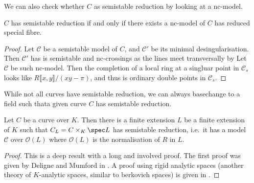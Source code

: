 We can also check whether $C$ as semistable reduction by looking at a nc-model. 
\begin{lemma}\label{lem:semistable_nc_model}
	$C$ has semistable reduction if and only if there exists a nc-model of  $C$ has reduced special fibre. 
\end{lemma}
\begin{proof}
	\ltr Let $ \mathscr C$ be a semistable model of $C$, and $\mathscr C'$ be its minimal desingularisation. 
	Then $\mathscr C'$ has is semistable and nc-crossings as the lines meet transversally by \cite[cor.\ 10.3.25]{liuAlgebraicGeometryArithmetic2002}
	\rtl Let  $\mathscr C$ be such nc-model. 
	Then the completion of a local ring at a singluar point in $\mathscr C_s$ looks like $R\llbracket x, y \rrbracket /(xy - \pi)$, and thus is ordinary double points in $\mathscr C_s$.
\end{proof}



While not all curves have semistable reduction, we can always basechange to a field such thata given curve  $C$ has semistable reduction. 

\begin{theorem}
	Let $C$ be a curve over $K$. 
	Then there is a finite extension $L$ be a finite extension of $K$ such that $C_L  = C \times _K \spec L$ has semistable reduction, i.e.\
	it has a model $\mathscr C$ over $\mathcal{O}(L)$ where $\mathcal{O}(L)$ is the normalisation of $R$ in $L$. 
\end{theorem}
\begin{proof}
	This is a deep result with a long and involved proof. 
	The first proof was given by Deligne and Mumford in \cite{deligneIrreducibilitySpaceCurves1969}. 
	A proof using rigid analytic spaces (another theory of $K$-analytic spaces, similar to berkovich spaces) is given in \cite{arzdorfAnotherProofSemistable2012}.
\end{proof}
